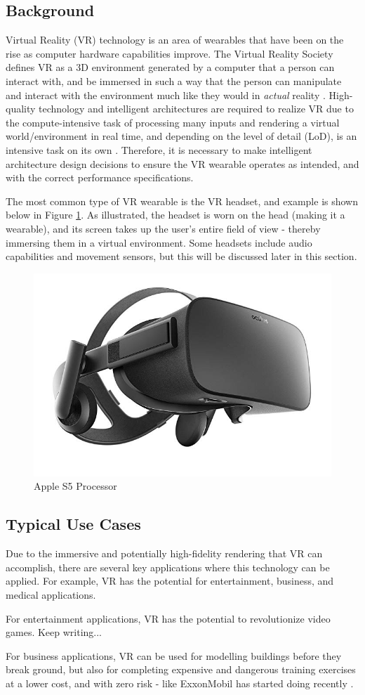 \subsection{Background}
Virtual Reality (VR) technology is an area of wearables that have been on the rise
as computer hardware capabilities improve. The Virtual Reality Society defines VR as
a 3D environment generated by a computer that a person can interact with, and be
immersed in such a way that the person can manipulate and interact with the environment
much like they would in \textit{actual} reality \cite{vr_soc_defn}. High-quality
technology and intelligent architectures are required to realize VR due to
the compute-intensive task of processing many inputs and rendering a virtual
world/environment in real time, and depending on the level of detail (LoD), is
an intensive task on its own \cite{hickey_wt4_pres}. Therefore, it is necessary
to make intelligent architecture design decisions to ensure the VR wearable operates
as intended, and with the correct performance specifications.

The most common type of VR wearable is the VR headset, and example is shown below in
Figure \ref{vr:example}. As illustrated, the headset is worn on the head (making it
a wearable), and its screen takes up the user's entire field of view - thereby immersing
them in a virtual environment. Some headsets include audio capabilities and movement
sensors, but this will be discussed later in this section.


\begin{figure}[h]
    \centering
    \includegraphics[width=.3\linewidth]{media/vr_headset_example.jpg}
    \caption{Apple S5 Processor \cite{vr_headset_pic}}
    \label{vr:example}
\end{figure}

\subsection{Typical Use Cases}
Due to the immersive and potentially high-fidelity rendering that VR can accomplish,
there are several key applications where this technology can be applied. For example, 
VR has the potential for entertainment, business, and medical applications.

For entertainment applications, VR has the potential to revolutionize video games.
Keep writing...

For business applications, VR can be used for modelling buildings before they break
ground, but also for completing expensive and dangerous training exercises at a lower
cost, and with zero risk - like ExxonMobil has started doing recently \cite{exxon_vr}.